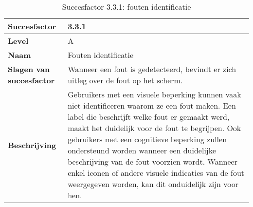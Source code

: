 \begin{table}[H]
    \centering
    \caption{Succesfactor 3.3.1: fouten identificatie}
    
    
    \hspace*{-1cm}\begin{tabular}{|l|p{12cm}|} 
        \hline
        \textbf{Succesfactor}                 & 3.3.1                                                                                                                                                                                                                                                                                                                                                                                                                                                                                                        \\ 
        \hline
        \textbf{Level}                        & A                                                                                                                                                                                                                                                                                                                                                                                                                                                                                                               \\ 
        \hline
        \textbf{Naam}                         & Fouten identificatie~                                                                                                                                                                                                                                                                                                                                                                                                                                                                                      \\ 
        \hline
        \textbf{Slagen van succesfactor}      & Wanneer een fout is gedetecteerd, bevindt er zich uitleg over de fout op het scherm.
        \\  
        \hline
        \textbf{Beschrijving}                 & Gebruikers met een visuele beperking kunnen vaak niet identificeren waarom ze een fout maken. Een label die beschrijft welke fout er gemaakt werd, maakt het duidelijk voor de fout te begrijpen. Ook gebruikers met een cognitieve beperking zullen ondersteund worden wanneer een duidelijke beschrijving van de fout voorzien wordt. Wanneer enkel iconen of andere visuele indicaties van de fout weergegeven worden, kan dit onduidelijk zijn voor hen.\\ 

\end{tabular}
\end{table}
